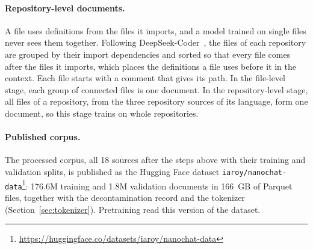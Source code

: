 \documentclass[sigconf,nonacm,balance=false]{acmart}
\begin{document}
\paragraph{Repository-level documents.} A file uses definitions from the files it imports, and a model trained on
single files never sees them together. Following DeepSeek-Coder~\cite{guo2024deepseekcoder}, the files of each
repository are grouped by their import dependencies and sorted so that every file comes after the files it imports,
which places the definitions a file uses before it in the context. Each file starts with a comment that gives its
path. In the file-level stage, each group of connected files is one document. In the repository-level stage, all files
of a repository, from the three repository sources of its language, form one document, so this stage trains on whole
repositories.

\paragraph{Published corpus.} The processed corpus, all 18 sources after the steps above with their training and
validation splits, is published as the Hugging Face dataset
\texttt{iaroy/\allowbreak nanochat-data}\footnote{\url{https://huggingface.co/datasets/iaroy/nanochat-data}}:
176.6M training and 1.8M validation documents in 166~GB of Parquet files, together with the decontamination record and
the tokenizer (Section~\ref{sec:tokenizer}). Pretraining read this version of the dataset.
\end{document}
